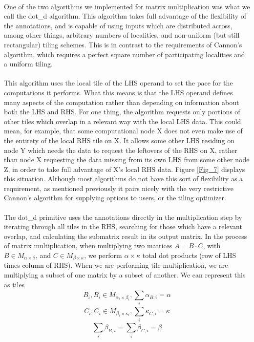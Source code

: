 \label{chap:dot_d}
\paragraph{}
One of the two algorithms we implemented for matrix multiplication was what we call the dot\_d algorithm. This algorithm takes full advantage of the flexibility of the annotations, and is capable of using inputs which are distributed across, among other things, arbitrary numbers of localities, and non-uniform (but still rectangular) tiling schemes. This is in contrast to the requirements of Cannon's algorithm, which requires a perfect square number of participating localities and a uniform tiling.
\paragraph{}
This algorithm uses the local tile of the LHS operand to set the pace for the computations it performs. What this means is that the LHS operand defines many aspects of the computation rather than depending on information about both the LHS and RHS. For one thing, the algorithm requests only portions of other tiles which overlap in a relevant way with the local LHS data. This could mean, for example, that some computational node X does not even make use of the entirety of the local RHS tile on X. It allows some other LHS residing on node Y which needs the data to request the leftovers of the RHS on X, rather than node X requesting the data missing from its own LHS  from some other node Z, in order to take full advantage of X's local RHS data. Figure \ref{Fig_7} displays this situation. Although most algorithms do not have this sort of flexibility as a requirement, as mentioned previously it pairs nicely with the very restrictive Cannon's algorithm for supplying options to users, or the tiling optimizer.
\paragraph{}
The dot\_d primitive uses the annotations directly in the multiplication step by iterating through all tiles in the RHS, searching for those which have a relevant overlap, and calculating the submatrix result in its output matrix. In the process of matrix multiplication, when multiplying two matrices $A=B\cdot C$, with $B \in M_{\alpha \times \beta}$, and $C \in M_{\beta \times \kappa}$, we perform $\alpha \times \kappa$ total dot products (row of LHS times column of RHS). When we are performing tile multiplication, we are multiplying a subset of one matrix by a subset of another. We can represent this as tiles $$B_i, B_i \in M_{\alpha_i \times \beta_i}, \sum_{i}^{} \alpha_{B,i} = \alpha$$ $$C_i, C_i \in M_{\beta_i \times \kappa_i}, \sum_{i}^{} \kappa_{C,i} = \kappa$$ $$\sum_{i}^{} \beta_{B, i} = \sum_{i}^{} \beta_{C, i} = \beta$$

